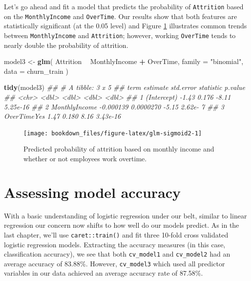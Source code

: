 \documentclass[]{krantz}
\makeatletter
\newenvironment{Shaded}{\begin{snugshade}}{\end{snugshade}}
\newcommand{\CommentTok}[1]{\textcolor[rgb]{0.37,0.37,0.37}{\textit{#1}}}
\newcommand{\DataTypeTok}[1]{\textcolor[rgb]{0.27,0.27,0.27}{#1}}
\newcommand{\KeywordTok}[1]{\textcolor[rgb]{0.27,0.27,0.27}{\textbf{#1}}}
\newcommand{\NormalTok}[1]{#1}
\newcommand{\OperatorTok}[1]{\textcolor[rgb]{0.43,0.43,0.43}{\textbf{#1}}}
\newcommand{\StringTok}[1]{\textcolor[rgb]{0.5,0.5,0.5}{#1}}
\newenvironment{kframe}{%
\medskip{}
\setlength{\fboxsep}{.8em}
 \def\at@end@of@kframe{}%
 \ifinner\ifhmode%
  \def\at@end@of@kframe{\end{minipage}}%
  \begin{minipage}{\columnwidth}%
 \fi\fi%
 \def\FrameCommand##1{\hskip\@totalleftmargin \hskip-\fboxsep
 \colorbox{shadecolor}{##1}\hskip-\fboxsep
     \hskip-\linewidth \hskip-\@totalleftmargin \hskip\columnwidth}%
 \MakeFramed {\advance\hsize-\width
   \@totalleftmargin\z@ \linewidth\hsize
   \@setminipage}}%
 {\par\unskip\endMakeFramed%
 \at@end@of@kframe}
\renewenvironment{Shaded}{\begin{kframe}}{\end{kframe}}
\makeatother
\begin{document}
Let's go ahead and fit a model that predicts the probability of \texttt{Attrition} based on the \texttt{MonthlyIncome} and \texttt{OverTime}. Our results show that both features are statistically significant (at the 0.05 level) and Figure \ref{fig:glm-sigmoid2} illustrates common trends between \texttt{MonthlyIncome} and \texttt{Attrition}; however, working \texttt{OverTime} tends to nearly double the probability of attrition.

\begin{Shaded}
\begin{Highlighting}[]
\NormalTok{model3 <-}\StringTok{ }\KeywordTok{glm}\NormalTok{(}
\NormalTok{  Attrition }\OperatorTok{~}\StringTok{ }\NormalTok{MonthlyIncome }\OperatorTok{+}\StringTok{ }\NormalTok{OverTime,}
  \DataTypeTok{family =} \StringTok{"binomial"}\NormalTok{, }
  \DataTypeTok{data =}\NormalTok{ churn_train}
\NormalTok{  )}

\KeywordTok{tidy}\NormalTok{(model3)}
\CommentTok{## # A tibble: 3 x 5}
\CommentTok{##   term           estimate std.error statistic  p.value}
\CommentTok{##   <chr>             <dbl>     <dbl>     <dbl>    <dbl>}
\CommentTok{## 1 (Intercept)   -1.43     0.176         -8.11 5.25e-16}
\CommentTok{## 2 MonthlyIncome -0.000139 0.0000270     -5.15 2.62e- 7}
\CommentTok{## 3 OverTimeYes    1.47     0.180          8.16 3.43e-16}
\end{Highlighting}
\end{Shaded}

\begin{figure}

{\centering \texttt{[image: bookdown\_files/figure-latex/glm-sigmoid2-1]} 

}

\caption{Predicted probability of attrition based on monthly income and whether or not employees work overtime.}\label{fig:glm-sigmoid2}
\end{figure}

\hypertarget{assessing-model-accuracy-1}{%
\section{Assessing model accuracy}\label{assessing-model-accuracy-1}}

With a basic understanding of logistic regression under our belt, similar to linear regression our concern now shifts to how well do our models predict. As in the last chapter, we'll use \texttt{caret::train()} and fit three 10-fold cross validated logistic regression models. Extracting the accuracy measures (in this case, classification accuracy), we see that both \texttt{cv\_model1} and \texttt{cv\_model2} had an average accuracy of 83.88\%. However, \texttt{cv\_model3} which used all predictor variables in our data achieved an average accuracy rate of 87.58\%.
\end{document}
